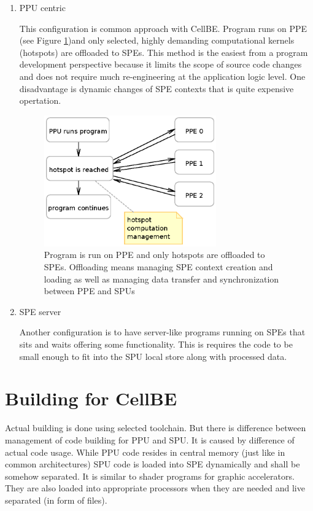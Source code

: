 \begin{enumerate}
\item PPU centric
\par
This configuration is common approach with CellBE.
 Program runs on PPE (see Figure \ref{fg:PPUCentricModel})and only selected, highly demanding computational kernels (hotspots) are offloaded to SPEs.
 This method is the easiest from a program development perspective because it limits the scope of source code changes and does not require much re-engineering at the application logic level.
 One disadvantage is dynamic changes of SPE contexts that is quite expensive opertation.

\begin{figure}
    \centering
    \includegraphics[width=0.7\textwidth]{data/PPUCentricModel}
    \caption[PPU centric configuration]{Program is run on PPE and only hotspots are offloaded to SPEs.
 Offloading means managing SPE context creation and loading as well as managing data transfer and synchronization between PPE and SPUs}
    \label{fg:PPUCentricModel}
\end{figure}

\item SPE server
\par
Another configuration is to have server-like programs running on SPEs that sits and waits offering some functionality.
 This is requires the code to be small enough to fit into the SPU local store along with processed data.

\end{enumerate}

\section {Building for CellBE}
\par
Actual building is done using selected toolchain.
 But there is difference between management of code building for PPU and SPU.
 It is caused by difference of actual code usage.
While PPU code resides in central memory (just like in common architectures) SPU code is loaded into SPE dynamically and shall be somehow separated.
 It is similar to shader programs for graphic accelerators.
They are also loaded into appropriate processors when they are needed and live separated (in form of files).

